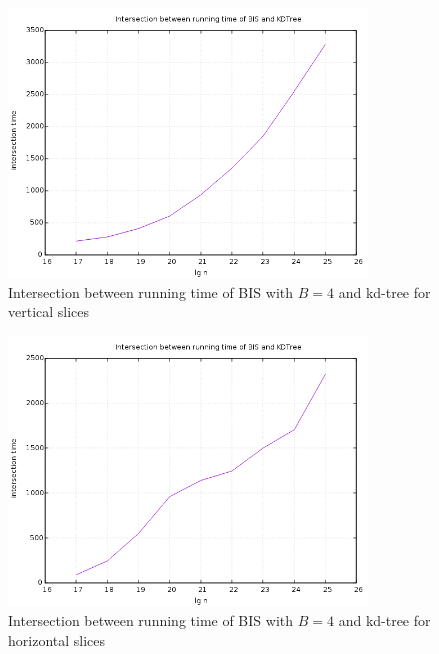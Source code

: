 \begin{figure}[h]
    \centering
    \includegraphics[width = 0.85\textwidth]{pictures/analysis/fours/vert.png}
    \caption{Intersection between running time of BIS with $B=4$ and kd-tree for vertical slices}\label{fig:b4_vert_intersection}
\end{figure}


\begin{figure}[h]
    \centering
    \includegraphics[width = 0.85\textwidth]{pictures/analysis/fours/hori.png}
    \caption{Intersection between running time of BIS with $B=4$ and kd-tree for horizontal slices}\label{fig:b4_hori_intersection}
\end{figure}


